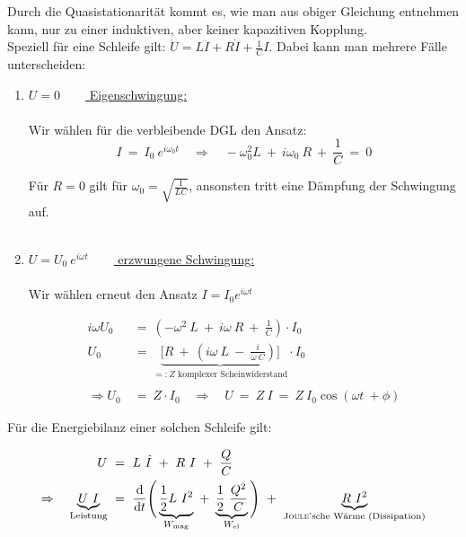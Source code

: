 Durch die Quasistationarität kommt es, wie man aus obiger Gleichung entnehmen kann, nur zu einer induktiven, aber keiner kapazitiven Kopplung.\\
Speziell für eine Schleife gilt: $\dot{U}=L\ddot{I}+R\dot{I}+\frac{1}{C}I$. Dabei kann man mehrere Fälle unterscheiden:
\ \\
\begin{enumerate}[label=\roman*)]
\item \underline{$U=0\qquad$ Eigenschwingung:}\\
\ \\
Wir wählen für die verbleibende DGL den Ansatz:
\begin{equation*}
I \ = \ I_0 \ e^{i\omega_0 t} \quad\Rightarrow\quad -\omega_0^2 L \ + \ i\omega_0 \ R \ + \ \frac{1}{C} \ = \ 0
\end{equation*}

Für $R=0$ gilt für $\omega_0=\sqrt{\frac{1}{LC}}$, ansonsten tritt eine Dämpfung der Schwingung auf.
\ \\\

\item \underline{$U=U_0 \ e^{i\omega t} \qquad$ erzwungene Schwingung:}\\
\ \\
Wir wählen erneut den Ansatz $I=I_0 e^{i\omega t}$

\begin{align*}
i\omega U_0  \ &= \ \left(-\omega^2 \ L \ + \ i \omega \ R \ + \ \frac{1}{C}\right) \cdot I_0\\
U_0 \ &= \ \underbrace{\Bigg[R \ + \ \left(i\omega \ L \ - \ \frac{i}{\omega \ C}\right)\Bigg]}_{=: Z \text{ komplexer Scheinwiderstand}} \cdot I_0\\
\ \\
\Rightarrow U_0 \ &= \ Z \cdot I_0 \quad\Rightarrow\quad U  \ = \ Z \ I  \ = \  Z \ I_0 \cos (\omega t \ + \phi)
\end{align*}
\end{enumerate}

Für die Energiebilanz einer solchen Schleife gilt:

\begin{align*}
U  \ &= \ L \ \dot{I} \ + \ R \ I \ + \ \frac{Q}{C}\\
\Rightarrow\quad \underbrace{U \ I}_{\text{Leistung}} \ &= \ \diff{}{t} \Bigg( \underbrace{\frac{1}{2}L \ I^2}_{W_{\text{mag}}} \ + \ \underbrace{\frac{1}{2} \ \frac{Q^2}{C}}_{W_{\text{el}}}\Bigg) \ + \ \underbrace{R \ I^2}_{\text{\textsc{Joule}'sche Wärme (Dissipation)}} 
\end{align*}


